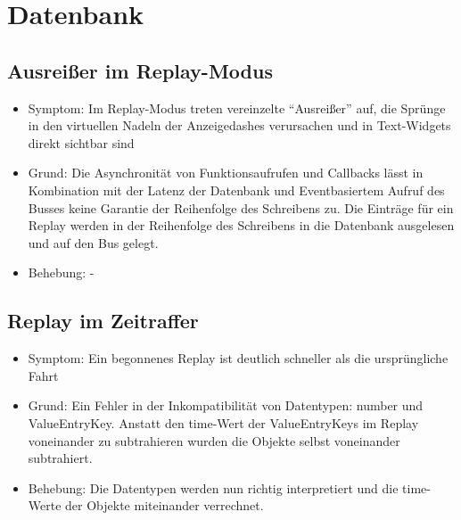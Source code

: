 \documentclass[qualitaetssicherung.tex]{subfiles}
\begin{document}
\section{Datenbank}

	\subsection{Ausreißer im Replay-Modus}
		\begin{itemize}
			\item
			Symptom: Im Replay-Modus treten vereinzelte ``Ausreißer'' auf, die Sprünge in den virtuellen Nadeln der Anzeigedashes verursachen und in Text-Widgets direkt sichtbar sind
			\item
			Grund: Die Asynchronität von Funktionsaufrufen und Callbacks lässt in Kombination mit der Latenz der Datenbank und Eventbasiertem Aufruf des Busses keine Garantie der Reihenfolge des Schreibens zu. Die Einträge für ein Replay werden in der Reihenfolge des Schreibens in die Datenbank ausgelesen und auf den Bus gelegt.
			\item
			Behebung: - 
		\end{itemize}
		
	\subsection{Replay im Zeitraffer}
		\begin{itemize}
			\item
			Symptom: Ein begonnenes Replay ist deutlich schneller als die ursprüngliche Fahrt 
			\item
			Grund: Ein Fehler in der Inkompatibilität von Datentypen: number und ValueEntryKey. Anstatt den time-Wert der ValueEntryKeys im Replay voneinander zu subtrahieren wurden die Objekte selbst voneinander subtrahiert.
			\item
			Behebung: Die Datentypen werden nun richtig interpretiert und die time-Werte der Objekte miteinander verrechnet.
		\end{itemize}
		
\end{document}
